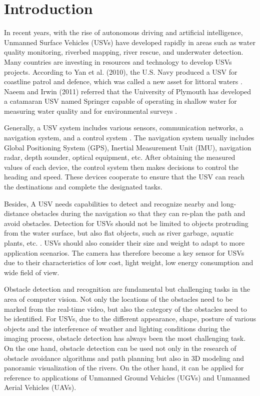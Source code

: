 \documentclass[journal,article,submit,moreauthors,pdftex]{Definitions/mdpi}
\begin{document}

\section{Introduction}

In recent years, with the rise of autonomous driving and artificial intelligence, Unmanned Surface Vehicles (USVs) have developed rapidly in areas such as water quality monitoring, riverbed mapping, river rescue, and underwater detection. Many countries are investing in resources and technology to develop USVs projects. According to Yan et al. (2010), the U.S. Navy produced a USV for coastline patrol and defence, which was called a new asset for littoral waters \cite{yan2010development}. Naeem and Irwin (2011) referred that the University of Plymouth has developed a catamaran USV named Springer capable of operating in shallow water for measuring water quality and for environmental surveys \cite{naeem2011evasive}.

Generally, a USV system includes various sensors, communication networks, a navigation system, and a control system \cite{casalino2009three}. The navigation system usually includes Global Positioning System (GPS), Inertial Measurement Unit (IMU), navigation radar, depth sounder, optical equipment, etc. After obtaining the measured values of each device, the control system then makes decisions to control the heading and speed. These devices cooperate to ensure that the USV can reach the destinations and complete the designated tasks.

Besides, A USV needs capabilities to detect and recognize nearby and long-distance obstacles during the navigation so that they can re-plan the path and avoid obstacles. Detection for USVs should not be limited to objects protruding from the water surface, but also flat objects, such as river garbage, aquatic plants, etc. \cite{7073635}. USVs should also consider their size and weight to adapt to more application scenarios. The camera has therefore become a key sensor for USVs due to their characteristics of low cost, light weight, low energy consumption and wide field of view.

Obstacle detection and recognition are fundamental but challenging tasks in the area of computer vision. Not only the locations of the obstacles need to be marked from the real-time video, but also the category of the obstacles need to be identified. For USVs, due to the different appearance, shape, posture of various objects and the interference of weather and lighting conditions during the imaging process, obstacle detection has always been the most challenging task. On the one hand, obstacle detection can be used not only in the research of obstacle avoidance algorithms and path planning but also in 3D modeling and panoramic visualization of the rivers. On the other hand, it can be applied for reference to applications of Unmanned Ground Vehicles (UGVs) and Unmanned Aerial Vehicles (UAVs).
\end{document}
